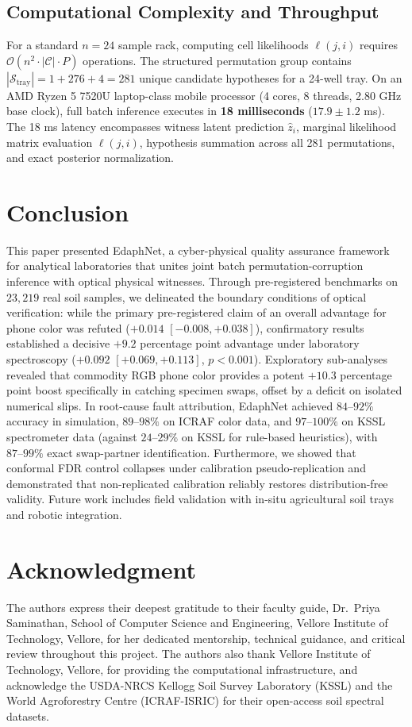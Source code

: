 \documentclass[journal,twoside]{IEEEtran}
\begin{document}
\subsection{Computational Complexity and Throughput}
For a standard $n = 24$ sample rack, computing cell likelihoods $\ell(j, i)$ requires $\mathcal{O}(n^2 \cdot |\mathcal{C}| \cdot P)$ operations. The structured permutation group contains $|\mathcal{S}_{\text{tray}}| = 1 + 276 + 4 = 281$ unique candidate hypotheses for a 24-well tray. On an AMD Ryzen 5 7520U laptop-class mobile processor (4 cores, 8 threads, 2.80 GHz base clock), full batch inference executes in \textbf{18 milliseconds} ($17.9 \pm 1.2$ ms). The 18 ms latency encompasses witness latent prediction $\hat{z}_i$, marginal likelihood matrix evaluation $\ell(j, i)$, hypothesis summation across all 281 permutations, and exact posterior normalization.

\section{Conclusion}
This paper presented EdaphNet, a cyber-physical quality assurance framework for analytical laboratories that unites joint batch permutation-corruption inference with optical physical witnesses. Through pre-registered benchmarks on $23{,}219$ real soil samples, we delineated the boundary conditions of optical verification: while the primary pre-registered claim of an overall advantage for phone color was refuted ($+0.014$ $[-0.008, +0.038]$), confirmatory results established a decisive $+9.2$ percentage point advantage under laboratory spectroscopy ($+0.092$ $[+0.069, +0.113]$, $p < 0.001$). Exploratory sub-analyses revealed that commodity RGB phone color provides a potent $+10.3$ percentage point boost specifically in catching specimen swaps, offset by a deficit on isolated numerical slips. In root-cause fault attribution, EdaphNet achieved $84\text{--}92\%$ accuracy in simulation, $89\text{--}98\%$ on ICRAF color data, and $97\text{--}100\%$ on KSSL spectrometer data (against $24\text{--}29\%$ on KSSL for rule-based heuristics), with $87\text{--}99\%$ exact swap-partner identification. Furthermore, we showed that conformal FDR control collapses under calibration pseudo-replication and demonstrated that non-replicated calibration reliably restores distribution-free validity. Future work includes field validation with in-situ agricultural soil trays and robotic integration.

\section*{Acknowledgment}
The authors express their deepest gratitude to their faculty guide, Dr.~Priya Saminathan, School of Computer Science and Engineering, Vellore Institute of Technology, Vellore, for her dedicated mentorship, technical guidance, and critical review throughout this project. The authors also thank Vellore Institute of Technology, Vellore, for providing the computational infrastructure, and acknowledge the USDA-NRCS Kellogg Soil Survey Laboratory (KSSL) and the World Agroforestry Centre (ICRAF-ISRIC) for their open-access soil spectral datasets.
\end{document}
